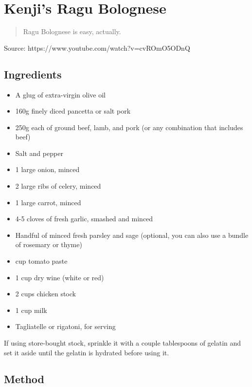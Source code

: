 \section{Kenji's Ragu Bolognese}


\begin{quote}
    Ragu Bolognese is easy, actually.
\end{quote}

Source: https://www.youtube.com/watch?v=cvROmO5ODnQ

\subsection{Ingredients}

\begin{itemize}
    \item A glug of extra-virgin olive oil
    \item 160g finely diced pancetta or salt pork
    \item 250g each of ground beef, lamb, and pork (or any combination that includes beef)
    \item Salt and pepper
    \item 1 large onion, minced
    \item 2 large ribs of celery, minced
    \item 1 large carrot, minced
    \item 4-5 cloves of fresh garlic, smashed and minced
    \item Handful of minced fresh parsley and sage (optional, you can also use a bundle of rosemary or thyme)
    \item {} cup tomato paste
    \item 1 cup dry wine (white or red)
    \item 2 cups chicken stock
    \item 1 cup milk
    \item Tagliatelle or rigatoni, for serving
\end{itemize}
    
If using store-bought stock, sprinkle it with a couple tablespoons of gelatin and set it aside until the gelatin is hydrated before using it.

\subsection{Method}

